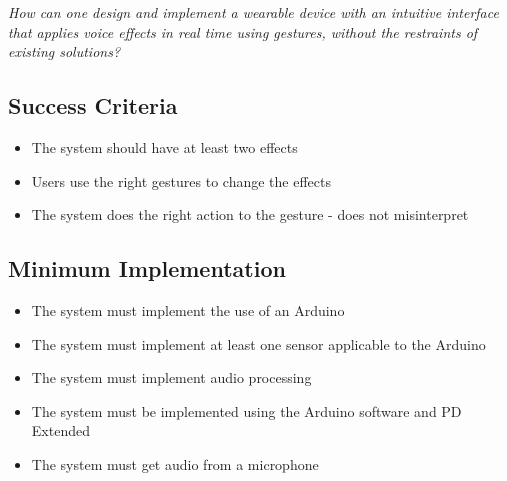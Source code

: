 \textit{How can one design and implement a wearable device with an intuitive interface that applies voice effects in real time using gestures, without the restraints of existing solutions?}

\subsection{Success Criteria}

\begin{itemize}
	\item The system should have at least two effects
	\item Users use the right gestures to change the effects
	\item The system does the right action to the gesture - does not misinterpret 
\end{itemize}



\subsection{Minimum Implementation}
\begin{itemize}
	\item The system must implement the use of an Arduino
	\item The system must implement at least one sensor applicable to the Arduino
	\item The system must implement audio processing
	\item The system must be implemented using the Arduino software and PD Extended
	\item The system must get audio from a microphone
\end{itemize}

